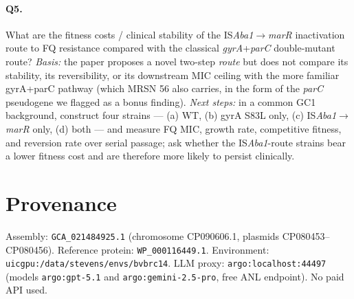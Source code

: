 \documentclass[11pt]{article}
\begin{document}
\paragraph{Q5.}  What are the fitness costs / clinical stability of the
IS\emph{Aba1}$\to$\emph{marR} inactivation route to FQ resistance
compared with the classical \emph{gyrA}+\emph{parC} double-mutant
route?  \emph{Basis:} the paper proposes a novel two-step \emph{route}
but does not compare its stability, its reversibility, or its
downstream MIC ceiling with the more familiar gyrA+parC pathway (which
MRSN 56 also carries, in the form of the \emph{parC} pseudogene we
flagged as a bonus finding).  \emph{Next steps:} in a common GC1
background, construct four strains
--- (a) WT, (b) gyrA S83L only, (c) IS\emph{Aba1}$\to$\emph{marR} only,
(d) both --- and measure FQ MIC, growth rate, competitive fitness,
and reversion rate over serial passage; ask whether the
IS\emph{Aba1}-route strains bear a lower fitness cost and are therefore
more likely to persist clinically.

\section{Provenance}

Assembly: \texttt{GCA\_021484925.1} (chromosome CP090606.1, plasmids
CP080453--CP080456).  Reference protein: \texttt{WP\_000116449.1}.
Environment: \texttt{uicgpu:/data/stevens/envs/bvbrc14}.
LLM proxy: \texttt{argo:localhost:44497} (models
\texttt{argo:gpt-5.1} and \texttt{argo:gemini-2.5-pro}, free ANL endpoint).
No paid API used.
\end{document}
